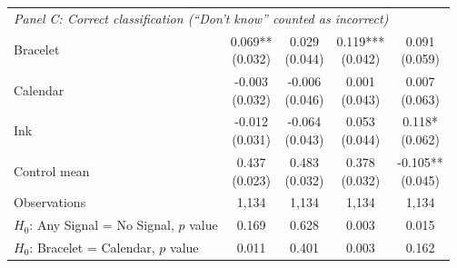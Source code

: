 {\begin{tabular}[t]{lcccc}
\multicolumn{5}{l}{\textit{Panel C: Correct classification (``Don't know'' counted as incorrect)}} \\
Bracelet & \makecell[c]{0.069**\\{(0.032)}} & \makecell[c]{0.029\\{(0.044)}} & \makecell[c]{0.119***\\{(0.042)}} & \makecell[c]{0.091\\{(0.059)}}\\
Calendar & \makecell[c]{-0.003\\{(0.032)}} & \makecell[c]{-0.006\\{(0.046)}} & \makecell[c]{0.001\\{(0.043)}} & \makecell[c]{0.007\\{(0.063)}}\\
Ink & \makecell[c]{-0.012\\{(0.031)}} & \makecell[c]{-0.064\\{(0.043)}} & \makecell[c]{0.053\\{(0.044)}} & \makecell[c]{0.118*\\{(0.062)}}\\
\midrule
Control mean & \makecell[c]{0.437\\{(0.023)}} & \makecell[c]{0.483\\{(0.032)}} & \makecell[c]{0.378\\{(0.032)}} & \makecell[c]{-0.105**\\{(0.045)}}\\
Observations & 1,134 & 1,134 & 1,134 & 1,134\\
\(H_0\): Any Signal = No Signal, \(p\) value & 0.169 & 0.628 & 0.003 & 0.015\\
\(H_0\): Bracelet = Calendar, \(p\) value & 0.011 & 0.401 & 0.003 & 0.162\\
\bottomrule
\end{tabular}}
